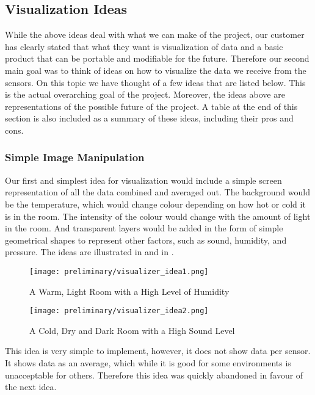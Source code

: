 \documentclass[../document]{subfiles}
\begin{document}
\subsection{Visualization Ideas}
While the above ideas deal with what we can make of the project, our customer has clearly stated that what they want is visualization of data and a basic product that can be portable and modifiable for the future. Therefore our second main goal was to think of ideas on how to visualize the data we receive from the sensors. On this topic we have thought of a few ideas that are listed below. This is the actual overarching goal of the project. Moreover, the ideas above are representations of the possible future of the project. A table at the end of this section is also included as a summary of these ideas, including their pros and cons.

\subsubsection{Simple Image Manipulation}
Our first and simplest idea for visualization would include a simple screen representation of all the data combined and averaged out. The background would be the temperature, which would change colour depending on how hot or cold it is in the room. The intensity of the colour would change with the amount of light in the room. And transparent layers would be added in the form of simple geometrical shapes to represent other factors, such as sound, humidity, and pressure. The ideas are illustrated in   and in .

\begin{figure}[H]
	\texttt{[image: preliminary/visualizer\_idea1.png]}
	\caption{A Warm, Light Room with a High Level of Humidity}
	\label{fig:visualizer_idea1}
\end{figure}

\begin{figure}[H]
	\texttt{[image: preliminary/visualizer\_idea2.png]}
	\caption{A Cold, Dry and Dark Room with a High Sound Level}
	\label{fig:visualizer_idea2}
\end{figure}

This idea is very simple to implement, however, it does not show data per sensor. It shows data as an average, which while it is good for some environments is unacceptable for others. Therefore this idea was quickly abandoned in favour of the next idea.
\end{document}
